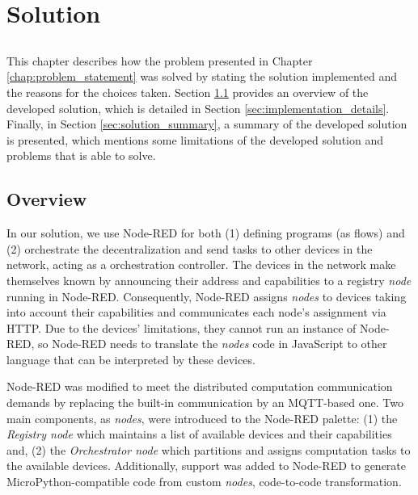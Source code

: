 \chapter{Solution} \label{chap:solution}

\section*{}

\minitoc \mtcskip \noindent
This chapter describes how the problem presented in Chapter \ref{chap:problem_statement} was solved by stating the solution implemented and the reasons for the choices taken. Section \ref{sec:solution_overview} provides an overview of the developed solution, which is detailed in Section \ref{sec:implementation_details}. Finally, in Section \ref{sec:solution_summary}, a summary of the developed solution is presented, which mentions some limitations of the developed solution and problems that is able to solve.

\section{Overview}\label{sec:solution_overview}

In our solution, we use Node-RED for both (1) defining programs (as flows) and (2) orchestrate the decentralization and send tasks to other devices in the network, acting as a orchestration controller. The devices in the network make themselves known by announcing their address and capabilities to a registry \textit{node} running in Node-RED. Consequently, Node-RED assigns \textit{nodes} to devices taking into account their capabilities and communicates each node's assignment via HTTP. Due to the devices' limitations, they cannot run an instance of Node-RED, so Node-RED needs to translate the \textit{nodes} code in JavaScript to other language that can be interpreted by these devices. 

Node-RED was modified to meet the distributed computation communication demands by replacing the built-in communication by an MQTT-based one. Two main components, as \textit{nodes}, were introduced to the Node-RED palette: (1) the \textit{Registry node} which maintains a list of available devices and their capabilities and, (2) the \textit{Orchestrator node} which partitions and assigns computation tasks to the available devices. Additionally, support was added to Node-RED to generate MicroPython-compatible code from custom \textit{nodes}, \ie code-to-code transformation.

